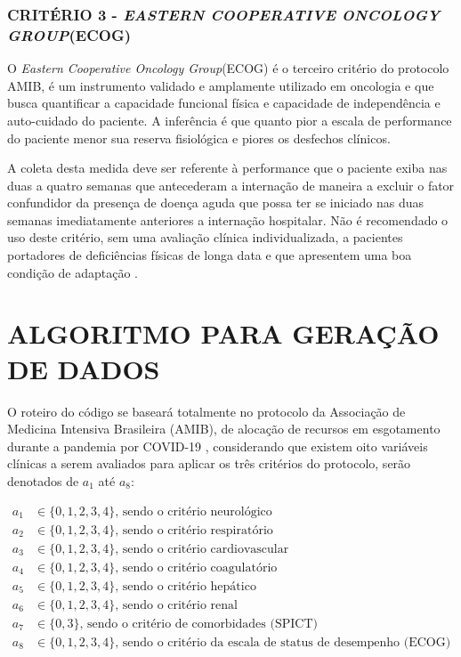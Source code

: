 \documentclass[12pt]{article}
\begin{document}
\subsubsection{CRITÉRIO 3 - \textit{EASTERN COOPERATIVE ONCOLOGY GROUP}(ECOG)}

O \textit{Eastern Cooperative Oncology Group}(ECOG) é o terceiro critério do protocolo AMIB, é um instrumento validado e amplamente utilizado em oncologia e que busca quantificar a capacidade funcional física e capacidade de independência e auto-cuidado do paciente. A inferência é que quanto pior a escala de performance do paciente menor sua reserva fisiológica e piores os desfechos clínicos.

A coleta desta medida deve ser referente à performance que o paciente exiba nas duas a quatro semanas que antecederam a internação de maneira a excluir o fator confundidor da presença de doença aguda que possa ter se iniciado nas duas semanas imediatamente anteriores a internação hospitalar. Não é recomendado o uso deste critério, sem uma avaliação clínica individualizada, a pacientes portadores de deficiências físicas de longa data e que apresentem uma boa condição de adaptação \cite{pinto2000physician}.

\section{ALGORITMO PARA GERAÇÃO DE DADOS}

O roteiro do código se baseará totalmente no protocolo da Associação de Medicina Intensiva Brasileira (AMIB), de alocação de recursos em esgotamento durante a pandemia por COVID-19 \cite{kretzer2020recomendaccoes}, considerando que existem oito variáveis clínicas a serem avaliados para aplicar os três critérios do protocolo, serão denotados de $a_1$ até $a_8$:

\[
    \begin{split}
        a_1 &\in \{0, 1, 2, 3, 4\}\text{, sendo o critério neurológico} \\
        a_2 &\in \{0, 1, 2, 3, 4\}\text{, sendo o critério respiratório} \\
        a_3 &\in \{0, 1, 2, 3, 4\}\text{, sendo o critério cardiovascular} \\
        a_4 &\in \{0, 1, 2, 3, 4\}\text{, sendo o critério coagulatório} \\
        a_5 &\in \{0, 1, 2, 3, 4\}\text{, sendo o critério hepático} \\
        a_6 &\in \{0, 1, 2, 3, 4\}\text{, sendo o critério renal} \\
        a_7 &\in \{0, 3\}\text{, sendo o critério de comorbidades (SPICT) } \\
        a_8 &\in \{0, 1, 2, 3, 4\}\text{, sendo o critério da escala de status de desempenho (ECOG)} \\
    \end{split}
\] 
\end{document}
